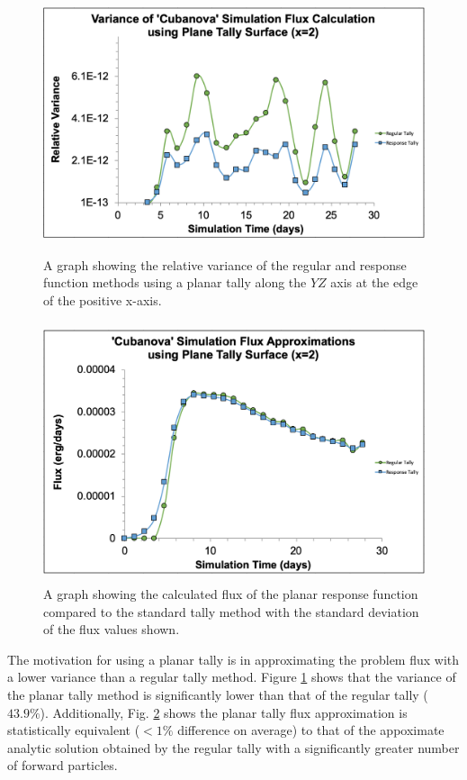 \begin{figure} [h!]
	\centering
	\includegraphics[height=3in]{VarReduction/plots/plane_response_var.png}
	\caption{A graph showing the relative variance of the regular and response function methods using a planar tally along the $YZ$ axis at the edge of the positive x-axis.}
	\label{fig:plane_response_var}
\end{figure}

\begin{figure} [h!]
	\centering
	\includegraphics[height=3in]{VarReduction/plots/plane_avg_error.png}
	\caption{A graph showing the calculated flux of the planar response function compared to the standard tally method with the standard deviation of the flux values shown. }
	\label{fig:plane_avg_flux}
\end{figure}

The motivation for using a planar tally is in approximating the problem flux with a lower variance than a regular tally method. Figure \ref{fig:plane_response_var} shows that the variance of the planar tally method is significantly lower than that of the regular tally ($43.9\%$).  Additionally, Fig. \ref{fig:plane_avg_flux} shows the planar tally flux approximation is statistically equivalent ($<1\%$ difference on average) to that of the appoximate analytic solution obtained by the regular tally with a significantly greater number of forward particles. 

